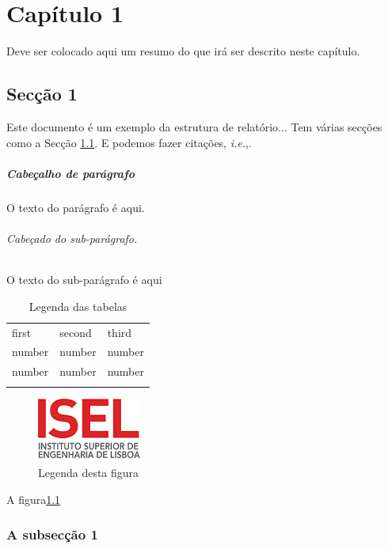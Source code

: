 \chapter{Capítulo 1}\label{cap1}

Deve ser colocado aqui um resumo do que irá ser descrito neste capítulo.



%
\section{Secção 1}\label{section:primeiraSec}
Este documento é um exemplo da estrutura de relatório... Tem várias secções como
a Secção \ref{section:primeiraSec}.  E podemos fazer citações, {\it i.e.},\citep{ref1}.

\paragraph{Cabeçalho de parágrafo} %
O texto do parágrafo é aqui.

\subparagraph{Cabeçado do sub-parágrafo.} %
O texto do sub-parágrafo é aqui 
%
%
\begin{table}
\centering
\caption{Legenda das tabelas}
\label{tab:1}       %
%
%
\begin{tabular}{lll}
\hline\noalign{\smallskip}
first & second & third  \\
\noalign{\smallskip}\hline\noalign{\smallskip}
number & number & number \\
number & number & number \\
\noalign{\smallskip}\hline
\end{tabular}
\end{table}
%
%

%
\begin{figure}[t]
\centering
\includegraphics[scale=0.8]{imgs/LOGO_principal}
\caption[ Legenda 1 resumida para a lista de figuras ]{
Legenda desta figura\label{fig1}}
\end{figure}
%

A figura\ref{fig1}


\subsection{A subsecção 1}


